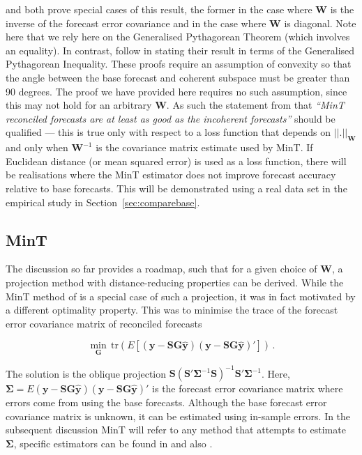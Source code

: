 \documentclass[12pt]{article}
\theoremstyle{definition}
\begin{document}
\citet{WicEtAl2019} and \citet{VanErven2015a} both prove special cases of this result, the former in the case where $\bm{W}$ is the inverse of the forecast error covariance and \citet{VanErven2015a} in the case where $\bm{W}$ is diagonal.  Note here that we rely here on the Generalised Pythagorean Theorem (which involves an equality). In contrast, \citet{WicEtAl2019} follow \citet{VanErven2015a} in stating their result in terms of the Generalised Pythagorean Inequality. These proofs require an assumption of convexity so that the angle between the base forecast and coherent subspace must be greater than 90 degrees. The proof we have provided here requires no such assumption, since this may not hold for an arbitrary $\bm{W}$. As such the statement from \citet{WicEtAl2019} that \emph{``MinT reconciled forecasts are at least as good as the incoherent forecasts''} should be qualified --- this is true only with respect to a loss function that depends on {\color{blue} $||.||_{\bm{W}}$ and only when $\bm{W}^{-1}$ is the covariance matrix estimate used by MinT}. If Euclidean distance (or mean squared error) is used {\color{blue} as a loss function}, there will be realisations where the MinT estimator does not improve forecast accuracy relative to base forecasts. This will be demonstrated using a real data set in the empirical study in Section~\ref{sec:comparebase}.

\subsection{MinT}

{\color{blue}The discussion so far provides a roadmap, such that for a given choice of $\bm{W}$, a projection method with distance-reducing properties can be derived}. While the MinT method of \citet{WicEtAl2019} {\color{blue} is a special case of such a projection, it was in fact motivated by a different optimality property.  This was to minimise the} trace of the forecast error covariance matrix of reconciled forecasts
	
{\color{blue}
\begin{equation}
\label{eq:MinTObj}
\underset{\bm{G}}{\min}\,\textrm{tr}(E\left[(\bm{y}-{\bm S}{\bm G}\hat{\bm{y}})(\bm{y}-{\bm S}{\bm G}\hat{\bm{y}})'\right])\,.
\end{equation}
} 

The solution is the oblique projection {\color{blue} $\bm{S}\left(\bm{S}'\bm{\Sigma}^{-1}\bm{S}\right)^{-1}\bm{S}'\bm{\Sigma}^{-1}$}. Here, {\color{blue}$\bm{\Sigma}=E(\bm{y}-{\bm S}{\bm G}\hat{\bm{y}})(\bm{y}-{\bm S}{\bm G}\hat{\bm{y}})'$} is the forecast error covariance matrix where errors come from using the base forecasts. Although the base forecast error covariance matrix is unknown, it can be estimated using in-sample errors.  {\color{blue} In the subsequent discussion MinT will refer to any method that attempts to estimate $\bm{\Sigma}$, specific estimators can be found in \cite{WicEtAl2019} and also \cite{NysEtAl2019}.}
\end{document}
